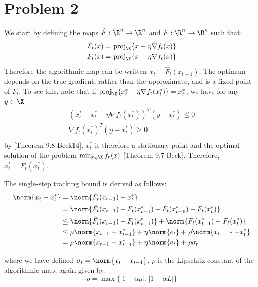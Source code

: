 \documentclass{homework}
\begin{document}
\section{Problem 2}

\begin{letterenum}
    \item We start by defining the maps $\hat{F}: \R^n \to \R^n$ and
    $F: \R^n \to \R^n$ such that:
    \begin{align*}
        \hat{F}_t(x) = \text{proj}_{\X} \{x - \eta \hat{\nabla}f_t(x)\} \\
        F_t(x) = \text{proj}_{\X} \{x - \eta \nabla f_t(x)\}
    \end{align*}
    Therefore the algorithmic map can be written $x_t = \hat{F}_t(x_{t-1})$.
    The optimum depends on the true gradient, rather than 
    the approximate, and is a fixed point of $F_t$. To see this, note that
    if $\text{proj}_\X \{x_t^* - \eta \nabla f_t(x_t^*)\} = x_t^*$, we have
    for any $y\in\X$
    \begin{align*}
        (x_t^* - x_t^* - \eta \nabla f_t(x_t^*))^T (y - x_t^*) \leq 0 \\
        \nabla f_t(x_t^*)^T (y - x_t^*) \geq 0 \\
    \end{align*}
    by [Theorem 9.8 Beck14]. $x_t^*$ is therefore a stationary point and
    the optimal solution of the problem $\min_{x\in\X} f_t(x)$ [Theorem 9.7 Beck].
    Therefore, $x_t^* = F_t(x_t^*)$.

    The single-step tracking bound is derived as follows:
    \begin{align*}
        \norm{x_t - x_t^*} &= \norm{\hat{F}_t(x_{t-1}) - x_t^*} \\
            &= \norm{\hat{F}_t(x_{t-1}) - F_t(x_{t-1}^*)
                                        + F_t(x_{t-1}^*) - F_t(x_t^*)} \\
            &\leq \norm{\hat{F}_t(x_{t-1}) - F_t(x_{t-1}^*)} +
                \norm{F_t(x_{t-1}^*) - F_t({x_t^*})} \\
            &\leq \rho \norm{x_{t-1} - x_{t-1}^*} + \eta \norm{e_t} + \rho
                \norm{x_{t-1}* - x_t^*} \\
            &= \rho \norm{x_{t-1} - x_{t-1}^*} + \eta \norm{e_t} + \rho \sigma_t \\
    \end{align*}

    where we have defined $\sigma_t = \norm{x_t - x_{t-1}}$. $\rho$ is the
    Lipschitz constant of the algorithmic map, again given by:
    \begin{equation*}
        \rho = \max\{|1 - \alpha \mu|, |1 - \alpha L|\}
    \end{equation*}


\end{letterenum}
\end{document}
